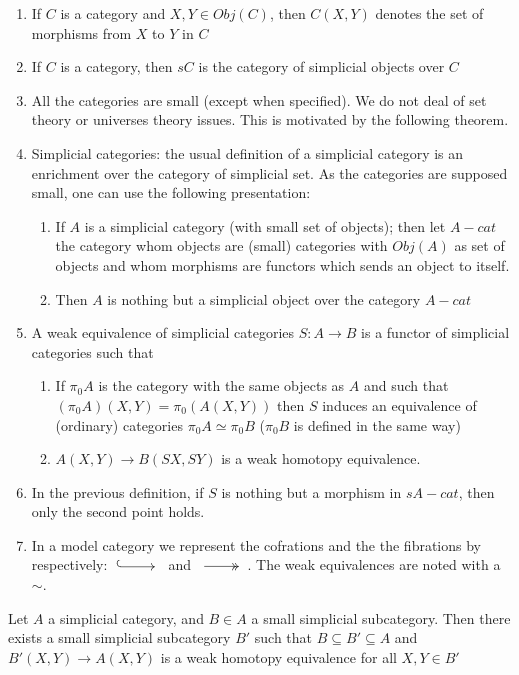 \begin{refsection}
\begin{enumerate}
\item If $C$ is a category and $X,Y \in Obj(C)$, then $C(X,Y)$ denotes the set of morphisms from $X$ to $Y$ in $C$
\item If $C$ is a category, then $sC$ is the category of simplicial objects over $C$ 
\item All the categories are small (except when specified). We do not deal of set theory or universes theory issues. This is motivated by the following theorem.
\item Simplicial categories: the usual definition of a simplicial category is an enrichment over the category of simplicial set. As the categories are supposed small, one can use the following presentation:
\begin{enumerate}
\item If $A$ is a simplicial category (with small set of objects); then let $A-cat$ the category whom objects are (small) categories with $Obj(A)$ as set of objects and whom morphisms are functors which sends an object to itself.
\item Then $A$ is nothing but a simplicial object over the category $A-cat$
\end{enumerate}
\item A weak equivalence of simplicial categories $S :A \rightarrow B$ is a functor of simplicial categories such that
\begin{enumerate}
\item If $\pi_0 A$ is the category with the same objects as $A$ and such that $(\pi_0 A) (X,Y)= \pi_0 (A(X,Y))$ then $S$ induces an equivalence of (ordinary) categories $\pi_0 A \simeq \pi_0 B$ ($\pi_0 B$ is defined in the same way)
\item $A(X,Y) \rightarrow B(SX,SY)$ is a weak homotopy equivalence.
\end{enumerate}
\item In the previous definition, if $S$ is nothing but a morphism in $sA-cat$, then only the second point holds.
\item In a model category we represent the cofrations and the the fibrations by respectively: $\xymatrix{{} \ar@{^{(}->}[r] & {}}$ and $\xymatrix{{} \ar@{->>}[r] & {}}$. The weak equivalences are noted with a $\sim$.
\end{enumerate}

\begin{thm}
Let $A$ a simplicial category, and $B \in A$ a small simplicial subcategory. Then there exists a small simplicial subcategory $B'$ such that $B \subseteq B' \subseteq A$ and $B'(X,Y) \rightarrow A(X,Y)$ is a weak homotopy equivalence for all $X,Y \in B'$
\end{thm}


\end{refsection}
